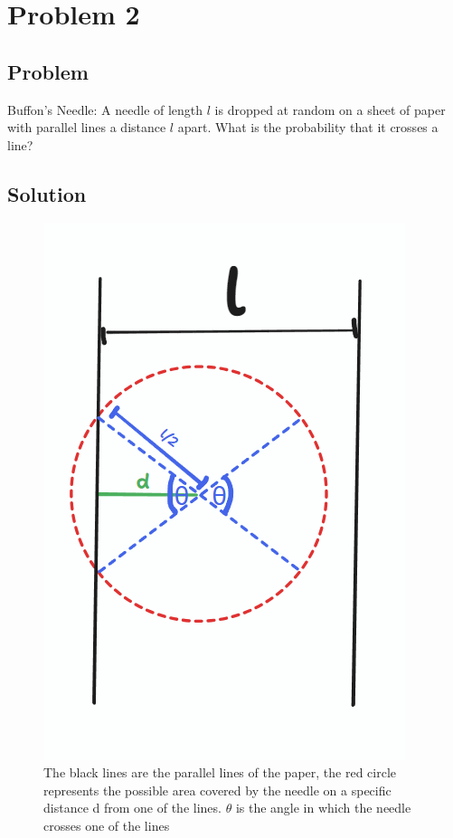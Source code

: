 \documentclass[12pt]{article}
\begin{document}
\newpage

\section{Problem 2}

\subsection{Problem}

Buffon's Needle: A needle of length $l$ is dropped at random on a sheet of paper with parallel lines a distance $l$ apart. What is the probability that it crosses a line?

\subsection{Solution}

\begin{figure}[H]
    \centering
    \includegraphics[scale=0.7]{Q2.png}
    \caption{The black lines are the parallel lines of the paper, the red circle represents the possible area covered by the needle on a specific distance d from one of the lines. $\theta$ is the angle in which the needle crosses one of the lines}
\end{figure}
\end{document}
